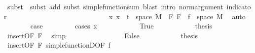 \begin{isabellebody}
\ {\isacharparenleft}{\kern0pt}subst\ {\isacharasterisk}{\kern0pt}{\isacharcomma}{\kern0pt}\ subst\ add{\isacharcomma}{\kern0pt}\ subst\ simple{\isacharunderscore}{\kern0pt}function{\isacharunderscore}{\kern0pt}sum{\isacharparenright}{\kern0pt}\ {\isacharparenleft}{\kern0pt}blast\ intro{\isacharcolon}{\kern0pt}\ norm{\isacharunderscore}{\kern0pt}argument\ indicator{\isacharparenright}{\kern0pt}{\isacharplus}{\kern0pt}\isanewline
\ \ \ \ \ \ \isamarkupfalse%
\ \isanewline
\ \ \ \ \isamarkupfalse%
\isanewline
\ \ \ \ \ \ \isamarkupfalse%
\ {}\isanewline
\ \ \ \ \ \ \isamarkupfalse%
\ x{\isacharcolon}{\kern0pt}\ {\isachardoublequoteopen}x\ {\isasymin}\ f\ {\isacharbackquote}{\kern0pt}\ space\ M{\isachardoublequoteclose}\ \ F{\isacharcolon}{\kern0pt}\ {\isachardoublequoteopen}F\ {\isasymsubseteq}\ f\ {\isacharbackquote}{\kern0pt}\ space\ M{\isachardoublequoteclose}\ \isamarkupfalse%
\ auto\isanewline
\ \ \ \ \ \ \isamarkupfalse%
\ {\isacharquery}{\kern0pt}case\ \isanewline
\ \ \ \ \ \ \isamarkupfalse%
\ {\isacharparenleft}{\kern0pt}cases\ {\isachardoublequoteopen}x\ {\isacharequal}{\kern0pt}\ {}{\isachardoublequoteclose}{\isacharparenright}{\kern0pt}\isanewline
\ \ \ \ \ \ \ \ \isamarkupfalse%
\ True\isanewline
\ \ \ \ \ \ \ \ \isamarkupfalse%
\ \isamarkupfalse%
\ {\isacharquery}{\kern0pt}thesis\ \isamarkupfalse%
\ {\isacharasterisk}{\kern0pt}\ \isamarkupfalse%
\ insert{\isacharparenleft}{\kern0pt}{}{\isacharparenright}{\kern0pt}{\isacharbrackleft}{\kern0pt}OF\ F{\isacharbrackright}{\kern0pt}\ \isamarkupfalse%
\ simp\isanewline
\ \ \ \ \ \ \isamarkupfalse%
\isanewline
\ \ \ \ \ \ \ \ \isamarkupfalse%
\ False\isanewline
\ \ \ \ \ \ \ \ \isamarkupfalse%
\ \isamarkupfalse%
\ {\isacharquery}{\kern0pt}thesis\ \isamarkupfalse%
\ {\isacharasterisk}{\kern0pt}\ \isamarkupfalse%
\ insert{\isacharparenleft}{\kern0pt}{}{\isacharparenright}{\kern0pt}{\isacharbrackleft}{\kern0pt}OF\ F{\isacharbrackright}{\kern0pt}\ simple{\isacharunderscore}{\kern0pt}functionD{\isacharparenleft}{\kern0pt}{}{\isacharparenright}{\kern0pt}{\isacharbrackleft}{\kern0pt}OF\ f{\isacharparenleft}{\kern0pt}{}{\isacharparenright}{\kern0pt}{\isacharbrackright}{\kern0pt}\ \isamarkupfalse%

\end{isabellebody}
